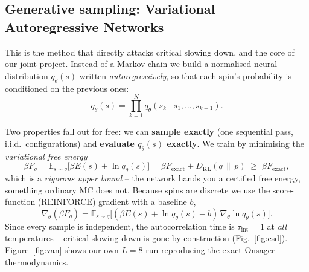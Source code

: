 \documentclass[11pt]{article}
\begin{document}
\subsection{Generative sampling: Variational Autoregressive Networks}
\label{sec:van}
This is the method that directly attacks critical slowing down, and the core of our joint
project. Instead of a Markov chain we build a normalised neural distribution $q_\theta(s)$
written \emph{autoregressively}, so that each spin's probability is conditioned on the
previous ones:
\begin{equation}
q_\theta(s)=\prod_{k=1}^{N} q_\theta\!\left(s_k \mid s_1,\dots,s_{k-1}\right).
\end{equation}

\begin{center}
\end{center}

\noindent Two properties fall out for free: we can \textbf{sample exactly} (one sequential
pass, i.i.d.\ configurations) and \textbf{evaluate $q_\theta(s)$ exactly}. We train by
minimising the \emph{variational free energy}
\begin{equation}
\beta F_q=\mathbb{E}_{s\sim q}\!\big[\beta E(s)+\ln q_\theta(s)\big]
=\beta F_{\text{exact}}+D_{\mathrm{KL}}(q\,\|\,p)\;\ge\;\beta F_{\text{exact}},
\end{equation}
which is a \emph{rigorous upper bound} -- the network hands you a certified free energy,
something ordinary MC does not. Because spins are discrete we use the score-function
(REINFORCE) gradient with a baseline $b$,
\begin{equation}
\nabla_\theta(\beta F_q)=\mathbb{E}_{s\sim q}\!\big[(\beta E(s)+\ln q_\theta(s)-b)\,\nabla_\theta\ln q_\theta(s)\big].
\end{equation}
Since every sample is independent, the autocorrelation time is $\tau_{\mathrm{int}}=1$ at
\emph{all} temperatures -- critical slowing down is gone by construction
(Fig.~\ref{fig:csd}). Figure~\ref{fig:van} shows our own $L=8$ run reproducing the exact
Onsager thermodynamics.
\end{document}
